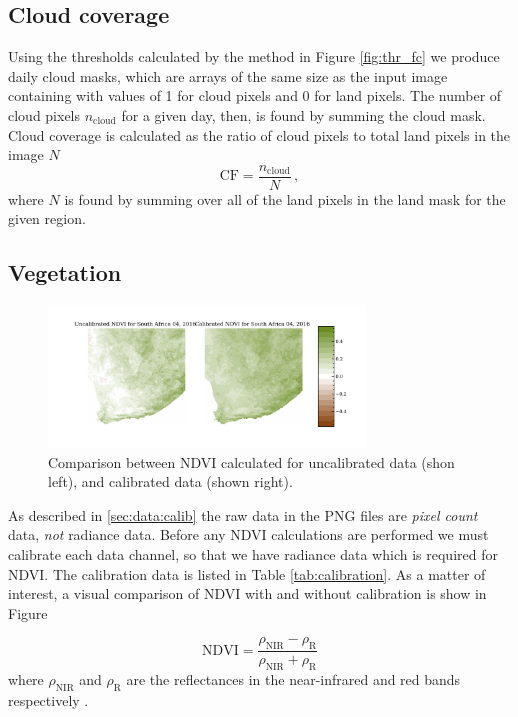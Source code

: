 \subsection{Cloud coverage}
Using the thresholds calculated by the method in Figure \ref{fig:thr_fc} we
produce daily cloud masks, which are arrays of the same size as the input image
containing with values of 1 for cloud pixels and 0 for land pixels. The number
of cloud pixels $n_{\mathrm{cloud}}$ for a given day, then, is found by summing
the cloud mask. Cloud coverage is calculated as the ratio of cloud pixels to
total land pixels in the image $N$
\begin{equation}
  \mathrm{CF} = \frac{n_{\mathrm{cloud}}}{N} \,,
  \label{eq:cloud_frac}
\end{equation}
where $N$ is found by summing over all of the land pixels in the land mask for
the given region.

\subsection{Vegetation}

\begin{figure}
  \centering
  \includegraphics[width=0.75\textwidth]{figures/ndvi_calibration_comparison.pdf}
  \caption{Comparison between NDVI calculated for uncalibrated data (shon left),
    and calibrated data (shown right).}
  \label{fig:calibrationcomp}
\end{figure}

As described in \ref{sec:data:calib} the raw data in the PNG files are
\emph{pixel count} data, \emph{not} radiance data. Before any NDVI calculations
are performed we must calibrate each data channel, so that we have radiance data
which is required for NDVI. The calibration data is listed in Table
\ref{tab:calibration}. As a matter of interest, a visual comparison of NDVI with
and without calibration is show in Figure 

\begin{equation}
  \mathrm{NDVI} = \frac{\rho_{\mathrm{NIR}}-\rho_{\mathrm{R}}}{\rho_{\mathrm{NIR}}+\rho_{\mathrm{R}}}
  \label{eq:ndvi}
\end{equation}
where $\rho_{\mathrm{NIR}}$ and $\rho_{\mathrm{R}}$ are the reflectances in the
near-infrared and red bands respectively \citep{tucker1979}.

